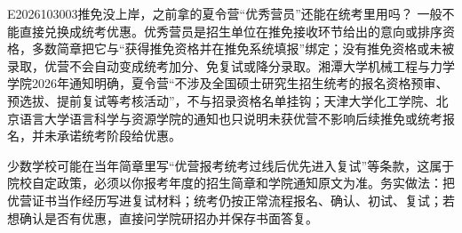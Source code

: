 \begin{qa}{E2026103003}{推免没上岸，之前拿的夏令营“优秀营员”还能在统考里用吗？}
一般不能直接兑换成统考优惠。优秀营员是招生单位在推免接收环节给出的意向或排序资格，多数简章把它与“获得推免资格并在推免系统填报”绑定；没有推免资格或未被录取，优营不会自动变成统考加分、免复试或降分录取。湘潭大学机械工程与力学学院2026年通知明确，夏令营“不涉及全国硕士研究生招生统考的报名资格预审、预选拔、提前复试等考核活动”，不与招录资格名单挂钩；天津大学化工学院、北京语言大学语言科学与资源学院的通知也只说明未获优营不影响后续推免或统考报名，并未承诺统考阶段给优惠。

少数学校可能在当年简章里写“优营报考统考过线后优先进入复试”等条款，这属于院校自定政策，必须以你报考年度的招生简章和学院通知原文为准。务实做法：把优营证书当作经历写进复试材料；统考仍按正常流程报名、确认、初试、复试；若想确认是否有优惠，直接问学院研招办并保存书面答复。
\end{qa}
